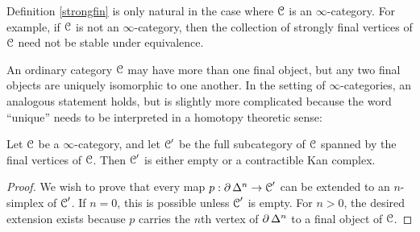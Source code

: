 \begin{1.2.12 Initial and final objects}
\begin{remark}
Definition \ref{strongfin} is only natural in the case where $\operatorname{\mathcal{C}}$ is an $\infty$-category. For example, if $\operatorname{\mathcal{C}}$ is not an $\infty$-category, then the collection of strongly final vertices of $\operatorname{\mathcal{C}}$ need not be stable under equivalence.
\end{remark}

An ordinary category $\operatorname{\mathcal{C}}$ may have more than one final object,
but any two final objects are uniquely isomorphic to one another.
In the setting of $\infty$-categories, an analogous statement holds,
but is slightly more complicated because the word ``unique'' needs to be
interpreted in a homotopy theoretic sense:

\begin{proposition}[Joyal]\label{initunique}
Let $\operatorname{\mathcal{C}}$ be a $\infty$-category, and let $\operatorname{\mathcal{C}}'$ be the full subcategory
of $\operatorname{\mathcal{C}}$ spanned by the final vertices of $\operatorname{\mathcal{C}}$. Then $\operatorname{\mathcal{C}}'$ is either empty or
a contractible Kan complex.
\end{proposition}

\begin{proof}
We wish to prove that every map $p: \operatorname{\partial} \Delta^n \rightarrow \operatorname{\mathcal{C}}'$
can be extended to an $n$-simplex of $\operatorname{\mathcal{C}}'$. If $n = 0$, this is
possible unless $\operatorname{\mathcal{C}}'$ is empty. For $n > 0$, the desired extension exists
because $p$ carries the $n$th vertex of $\operatorname{\partial} \Delta^n$ to a final
object of $\operatorname{\mathcal{C}}$.
\end{proof}
\end{1.2.12 Initial and final objects}
